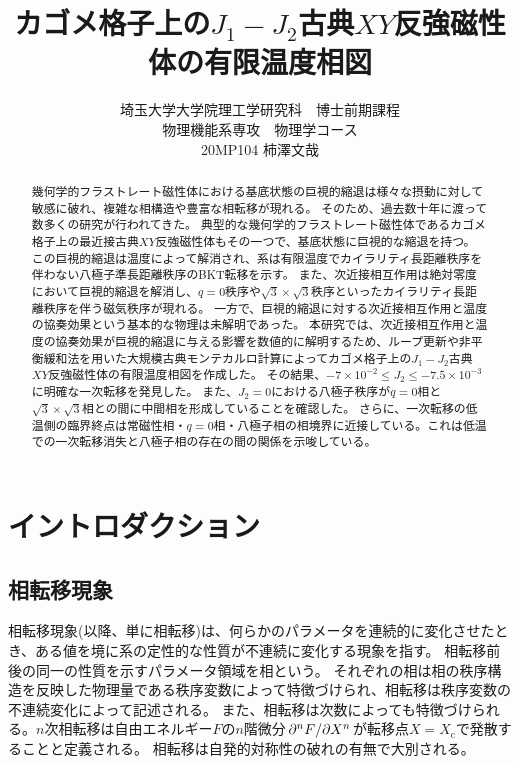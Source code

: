\documentclass[12pt,titlepage,dvipdfmx]{jarticle}
\title{カゴメ格子上の$J_1 - J_2$古典$XY$反強磁性体の有限温度相図}
\author{埼玉大学大学院理工学研究科　博士前期課程\\物理機能系専攻　物理学コース\\20MP104 柿澤文哉 }
\begin{document}
\maketitle

\newpage

\begin{abstract}
幾何学的フラストレート磁性体における基底状態の巨視的縮退は様々な摂動に対して敏感に破れ、複雑な相構造や豊富な相転移が現れる。
そのため、過去数十年に渡って数多くの研究が行われてきた。
典型的な幾何学的フラストレート磁性体であるカゴメ格子上の最近接古典$XY$反強磁性体もその一つで、基底状態に巨視的な縮退を持つ。
この巨視的縮退は温度によって解消され、系は有限温度でカイラリティ長距離秩序を伴わない八極子準長距離秩序のBKT転移\cite{Berezinskii1972,Kosterlitz1973}を示す\cite{Rzchowski1997}。
また、次近接相互作用は絶対零度において巨視的縮退を解消し、$q=0$秩序や$\sqrt{3}\times\sqrt{3}$秩序といったカイラリティ長距離秩序を伴う磁気秩序が現れる\cite{Harris1992}。
一方で、巨視的縮退に対する次近接相互作用と温度の協奏効果という基本的な物理は未解明であった。
本研究では、次近接相互作用と温度の協奏効果が巨視的縮退に与える影響を数値的に解明するため、ループ更新や非平衡緩和法を用いた大規模古典モンテカルロ計算によってカゴメ格子上の$J_1-J_2$古典$XY$反強磁性体の有限温度相図を作成した。
その結果、$-7\times10^{-2}\le J_2\le-7.5\times10^{-3}$に明確な一次転移を発見した。
また、$J_2=0$における八極子秩序が$q=0$相と$\sqrt{3}\times\sqrt{3}$相との間に中間相を形成していることを確認した。
さらに、一次転移の低温側の臨界終点は常磁性相・$q=0$相・八極子相の相境界に近接している。これは低温での一次転移消失と八極子相の存在の間の関係を示唆している。
   


\end{abstract}

\tableofcontents

\newpage

\newpage 

\section{イントロダクション}
\subsection{相転移現象}
相転移現象(以降、単に相転移)は、何らかのパラメータを連続的に変化させたとき、ある値を境に系の定性的な性質が不連続に変化する現象を指す。
相転移前後の同一の性質を示すパラメータ領域を相という。
それぞれの相は相の秩序構造を反映した物理量である秩序変数によって特徴づけられ、相転移は秩序変数の不連続変化によって記述される。
また、相転移は次数によっても特徴づけられる。$n$次相転移は自由エネルギー$F$の$n$階微分$\pdv*[n]{F}{X}$が転移点$X=X_{\mathrm{c}}$で発散することと定義される。
相転移は自発的対称性の破れの有無で大別される。
\end{document}
